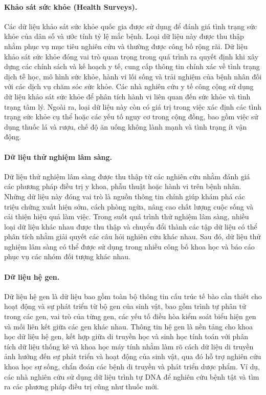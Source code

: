 \paragraph{Khảo sát sức khỏe (Health Surveys).}
Các dữ liệu khảo sát sức khỏe quốc gia được sử dụng để đánh giá tình trạng sức khỏe của dân số và ước tính tỷ lệ mắc bệnh. Loại dữ liệu này được thu thập nhằm phục vụ mục tiêu nghiên cứu và thường được công bố rộng rãi. Dữ liệu khảo sát sức khỏe đóng vai trò quan trọng trong quá trình ra quyết định khi xây dựng các chính sách và kế hoạch y tế, cung cấp thông tin chính xác về tình trạng dịch tễ học, mô hình sức khỏe, hành vi lối sống và trải nghiệm của bệnh nhân đối với các dịch vụ chăm sóc sức khỏe. Các nhà nghiên cứu y tế công cộng sử dụng dữ liệu khảo sát sức khỏe để phân tích hành vi liên quan đến sức khỏe và tình trạng tâm lý. Ngoài ra, loại dữ liệu này còn có giá trị trong việc xác định các tình trạng sức khỏe cụ thể hoặc các yếu tố nguy cơ trong cộng đồng, bao gồm việc sử dụng thuốc lá và rượu, chế độ ăn uống không lành mạnh và tình trạng ít vận động.
 
\paragraph{Dữ liệu thử nghiệm lâm sàng.}
Dữ liệu thử nghiệm lâm sàng được thu thập từ các nghiên cứu nhằm đánh giá các phương pháp điều trị y khoa, phẫu thuật hoặc hành vi trên bệnh nhân. Những dữ liệu này đóng vai trò là nguồn thông tin chính giúp khám phá các triệu chứng xuất hiện sớm, cách phòng ngừa, nâng cao chất lượng cuộc sống và cải thiện hiệu quả làm việc. Trong suốt quá trình thử nghiệm lâm sàng, nhiều loại dữ liệu khác nhau được thu thập và chuyển đổi thành các tập dữ liệu có thể phân tích nhằm giải quyết các câu hỏi nghiên cứu khác nhau. Sau đó, dữ liệu thử nghiệm lâm sàng có thể được sử dụng trong nhiều công bố khoa học và báo cáo phục vụ các nhóm đối tượng khác nhau.
 
\paragraph{Dữ liệu hệ gen.}
Dữ liệu hệ gen là dữ liệu bao gồm toàn bộ thông tin cấu trúc tế bào cần thiết cho hoạt động và sự phát triển từ bộ gen của sinh vật, bao gồm trình tự phân tử trong các gen, vai trò của từng gen, các yếu tố điều hòa kiểm soát biểu hiện gen và mối liên kết giữa các gen khác nhau. Thông tin hệ gen là nền tảng cho khoa học dữ liệu hệ gen, kết hợp giữa di truyền học và sinh học tính toán với phân tích dữ liệu thống kê và khoa học máy tính nhằm làm rõ cách dữ liệu di truyền ảnh hưởng đến sự phát triển và hoạt động của sinh vật, qua đó hỗ trợ nghiên cứu khoa học sự sống, chẩn đoán các bệnh di truyền và phát triển dược phẩm. Ví dụ, các nhà nghiên cứu sử dụng dữ liệu trình tự DNA để nghiên cứu bệnh tật và tìm ra các phương pháp điều trị cũng như thuốc mới.
 
